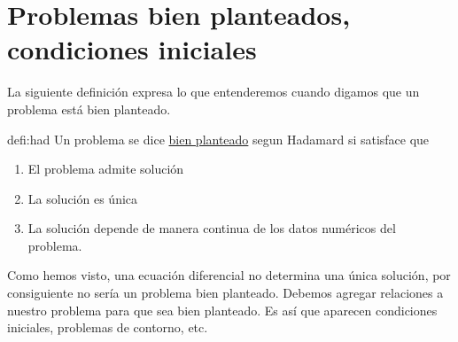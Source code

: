 

\section{Problemas bien planteados, condiciones iniciales}

La siguiente definición expresa lo que entenderemos cuando digamos que un problema está bien planteado.


 \begin{definicion}{defi:had}
 Un problema se dice  \href{http://es.wikipedia.org/wiki/Problema_bien_definido}{bien planteado} segun Hadamard si satisface que

 \begin{enumerate}
  \item\label{it:had1} El problema admite solución
  \item\label{it:had2} La solución es única
  \item\label{it:had3} La solución depende de manera continua de los datos numéricos del problema.
 \end{enumerate}
\end{definicion}
 Como hemos visto, una ecuación diferencial no determina una única solución, por consiguiente no sería un problema bien planteado. Debemos agregar relaciones
a nuestro problema para que sea bien planteado. Es así que aparecen condiciones iniciales, problemas de contorno, etc.




